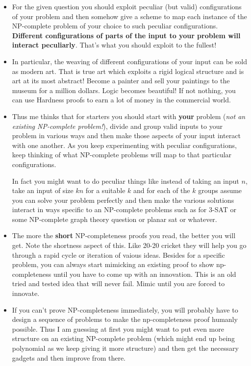 \begin{itemize}
\item For the given question you should exploit peculiar (but valid) configurations of your problem and then 
somehow give a scheme to map each instance of the NP-complete problem of your choice to such peculiar configurations.
\textbf{Different configurations of parts of the input to your problem will interact peculiarly}. That's what you should
exploit to the fullest!

\item In particular, the weaving of different configurations of your input can be sold as modern art. That is true art
which exploits a rigid logical structure and is art at its most abstract! Become a painter and sell your paintings
to the museum for a million dollars. Logic becomes beautiful! If not nothing, you can use Hardness proofs to earn
a lot of money in the commercial world.

\item Thus me thinks that for starters you should start with \textbf{your} problem (\emph{not an existing NP-complete problem!}), divide 
and group valid inputs to your problem in various ways and then make those aspects of your input interact with one another. 
As you keep experimenting with peculiar configurations, keep thinking of what NP-complete problems will map to that particular 
configurations.

In fact you might want to do peculiar things like instead of taking an input \(n\), take an input of size \(kn\) for a suitable 
\(k\) and for each of the \(k\) groups assume you can solve your problem perfectly and then make the various solutions interact
in ways specific to an NP-complete problems such as for 3-SAT or some NP-complete graph theory question or planar sat or 
whatever.

\item The more the \textbf{short} NP-completeness proofs you read, the better you will get.  Note the shortness aspect of this. 
Like 20-20 cricket they will help you go through a rapid cycle or iteration of vaious ideas. Besides for a specific problem, 
you can always start mimicking an existing proof to show np-completeness until you have to come up with an innovation.
This is an old tried and tested idea that will never fail. Mimic until you are forced to innovate.

\item If you can't prove NP-completeness immediately, you will probably have to design a sequence of problems 
to make the np-completeness proof humanly possible. Thus I am guessing at first you might want to put 
even more structure on an existing NP-complete problem (which might end up being polynomial as we keep giving it more structure)
and then get the necessary gadgets and then improve from there.


\end{itemize}

